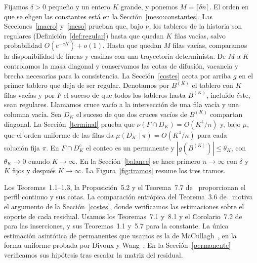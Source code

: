Fijamos $\delta>0$ pequeño y un entero $K$ grande, y ponemos $M=\lceil\delta n\rceil$. El orden en
que se eligen las constantes está en la Sección~\ref{meso:constantes}. Las Secciones~\ref{macro}
y~\ref{meso} prueban que, bajo $\nu$, los tableros de la historia son regulares
(Definición~\ref{def:regular}) hasta que quedan $K$ filas vacías, salvo probabilidad
$O(e^{-cK})+o(1)$. Hasta que quedan $M$ filas vacías, comparamos la disponibilidad de líneas y
casillas con una trayectoria determinista. De $M$ a $K$ controlamos la masa diagonal y conservamos
las cotas de difusión, vacancia y brecha necesarias para la consistencia. La Sección~\ref{costes}
acota por arriba $g$ en el primer tablero que deja de ser regular. Denotamos por $B^{(K)}$ el tablero
con $K$ filas vacías y por $F$ el suceso de que todos los tableros hasta $B^{(K)}$, incluido éste, sean
regulares. Llamamos cruce vacío a la intersección de una fila vacía y una columna vacía. Sea $D_K$
el suceso de que dos cruces vacíos de $B^{(K)}$ compartan diagonal. La
Sección~\ref{terminal} prueba que
$\nu(F\cap D_K)=O(K^4/n)$ y, bajo $\mu$, que el orden uniforme de las filas da
$\mu(D_K\mid\pi)=O(K^4/n)$ para cada solución fija $\pi$. En $F\cap D_K^c$ el conteo es un permanente
y $|g(B^{(K)})|\le\theta_K$, con $\theta_K\to0$ cuando $K\to\infty$. En la Sección~\ref{balance} se hace
primero $n\to\infty$ con $\delta$ y $K$ fijos y después $K\to\infty$. La
Figura~\ref{fig:tramos} resume los tres tramos.

Los Teoremas~1.1--1.3, la Proposición~5.2 y el Teorema~7.7 de~\cite{perfil} proporcionan el
perfil continuo y sus cotas. La comparación entrópica del Teorema~3.6 de~\cite{ultimas}
motiva el argumento de la Sección~\ref{costes}, donde verificamos las estimaciones sobre el
soporte de cada residual. Usamos los Teoremas~7.1 y~8.1 y el Corolario~7.2 de~\cite{pred}
para las inserciones, y sus Teoremas~1.1 y~5.7 para la constante. La única estimación
asintótica de permanentes que usamos es la de McCullagh~\cite{mccullagh}, en la forma uniforme
probada por Divoux y Wang~\cite[Proposición~3.1 y Observación~2.1]{dw}.
En la Sección~\ref{permanente} verificamos sus hipótesis tras escalar la matriz del residual.
